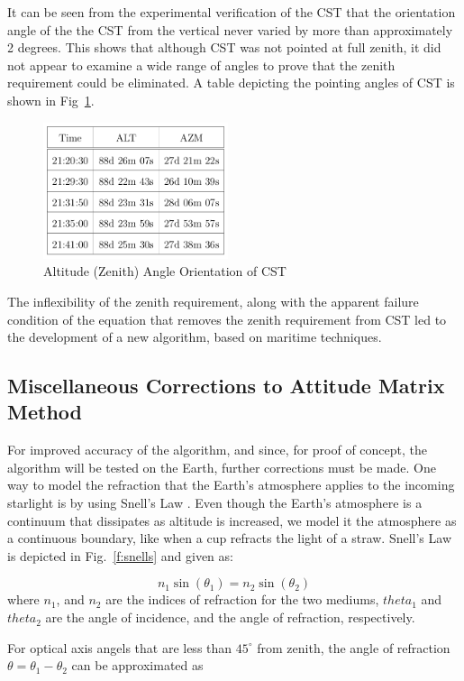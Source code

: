 \documentclass[12pt,a4paper]{book}
\begin{document}
It can be seen from the experimental verification of the CST that the orientation angle of the the CST from the vertical never varied by more than approximately 2 degrees. This shows that although CST was not pointed at full zenith, it did not appear to examine a wide range of angles to prove that the zenith requirement could be eliminated.  A table depicting the pointing angles of CST is shown in Fig~\ref{f:alt}.
\begin{figure}[!ht]
\centering
\includegraphics[height=4cm]{altitude.png}
\caption{Altitude (Zenith) Angle Orientation of CST}
\label{f:alt}
\end{figure}
The inflexibility of the zenith requirement, along with the apparent failure condition of the equation that removes the zenith requirement from CST led to the development of a new algorithm, based on maritime techniques.  \\
\FloatBarrier
\subsection{Miscellaneous Corrections to Attitude Matrix Method}
For improved accuracy of the algorithm, and since, for proof of concept, the algorithm will be tested on the Earth, further corrections must be made.  One way to model the refraction that the Earth's atmosphere applies to the incoming starlight is by using Snell's Law \cite{b:knight}.  Even though the Earth's atmosphere is a continuum that dissipates as altitude is increased, we model it the atmosphere as a continuous boundary, like when a cup refracts the light of a straw. Snell's Law is depicted in Fig.~\ref{f:snells} and given as:

\begin{equation}
n_{1}\sin(\theta_{1}) = n_{2}\sin(\theta_{2})
\end{equation}
where $n_{1}$, and $n_{2}$ are the indices of refraction for the two mediums, $theta_{1}$ and $theta_{2}$ are the angle of incidence, and the angle of refraction, respectively. 

For optical axis angels that are less than $45^{\circ}$ from zenith, the angle of refraction $\theta = \theta_{1} - \theta_{2}$ can be approximated as
\end{document}
